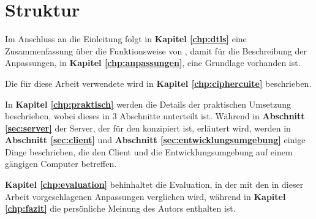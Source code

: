 \section{Struktur}

Im Anschluss an die Einleitung folgt in \textbf{Kapitel \ref{chp:dtls}} eine Zusammenfassung
über die Funktionsweise von , damit für die Beschreibung der Anpassungen,
in \textbf{Kapitel \ref{chp:anpassungen}}, eine Grundlage vorhanden ist.

Die für diese Arbeit verwendete  wird in \textbf{Kapitel \ref{chp:ciphercuite}} beschrieben.

In \textbf{Kapitel \ref{chp:praktisch}} werden die Details der praktischen Umsetzung beschrieben, wobei
dieses in 3 Abschnitte unterteilt ist. Während in \textbf{Abschnitt \ref{sec:server}} der Server, der für den
 konzipiert ist, erläutert wird, werden in \textbf{Abschnitt \ref{sec:client}} und
\textbf{Abschnitt \ref{sec:entwicklungsumgebung}} einige Dinge beschrieben, die den Client und
die Entwicklungsumgebung auf einem gängigen Computer betreffen.

\textbf{Kapitel \ref{chp:evaluation}} behinhaltet die Evaluation, in der  mit den in
dieser Arbeit vorgeschlagenen Anpassungen verglichen wird, während in \textbf{Kapitel \ref{chp:fazit}}
die persönliche Meinung des Autors enthalten ist.